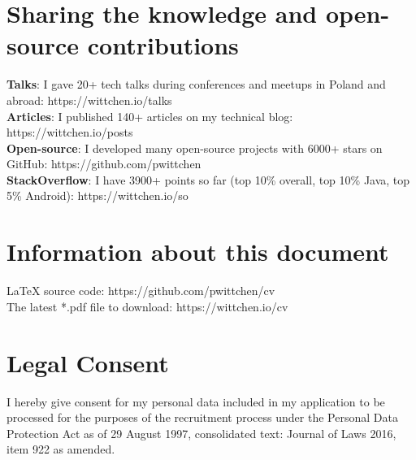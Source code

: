 \documentclass[letterpaper,11pt]{article}
\begin{document}
\section{Sharing the knowledge and open-source contributions}
 \begin{itemize}[leftmargin=0.15in, label={}]
    \small{\item{
     \textbf{Talks}{: I gave 20+ tech talks during conferences and meetups in Poland and abroad: https://wittchen.io/talks} \\
     \textbf{Articles}{: I published 140+ articles on my technical blog: https://wittchen.io/posts} \\
     \textbf{Open-source}{: I developed many open-source projects with 6000+ stars on GitHub: https://github.com/pwittchen} \\
     \textbf{StackOverflow}{: I have 3900+ points so far (top 10\% overall, top 10\% Java, top 5\% Android): https://wittchen.io/so}
    }}
 \end{itemize}

\section{Information about this document}
 \begin{itemize}[leftmargin=0.15in, label={}]
    \small{\item{
    {LaTeX source code: https://github.com/pwittchen/cv} \\
    {The latest *.pdf file to download: https://wittchen.io/cv}
    }}
 \end{itemize}

\section{Legal Consent}
 \begin{itemize}[leftmargin=0.15in, label={}]
    \small{\item{
    I hereby give consent for my personal data included in my application
    to be processed for the purposes of the recruitment process
    under the Personal Data Protection Act as of 29 August 1997,
    consolidated text: Journal of Laws 2016, item 922 as amended. \\
    }}
 \end{itemize}

\end{document}
